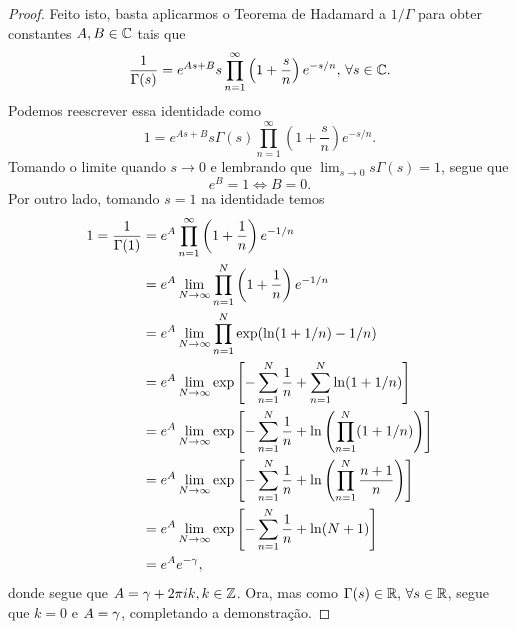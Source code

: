 \begin{proof}
        Feito isto, basta aplicarmos o Teorema de Hadamard a $1/\Gamma$ para obter constantes
        $A,B\in\mathbb{C}$ tais que
        \[
        \frac{1}{\Gamma(s)} = e^{As + B}s\prod_{n=1}^{\infty} \left(1 + \frac{s}{n}\right)e^{-s/n}, \,
        \forall s\in\mathbb{C}.
        \]
        Podemos reescrever essa identidade como
        \[
        1 = e^{As + B}s\Gamma(s)\prod_{n=1}^{\infty} \left(1 + \frac{s}{n}\right)e^{-s/n}.
        \]
        Tomando o limite quando $s\to 0$ e lembrando que $\lim_{s\to 0}s\Gamma(s) = 1$, segue que
        \[
        e^B = 1 \iff B = 0.
        \]
        Por outro lado, tomando $s=1$ na identidade temos
        \begin{align*}
            1 = \frac{1}{\Gamma(1)} &= e^A \prod_{n=1}^{\infty} \left(1 + \frac{1}{n}\right)e^{-1/n} \\
                                &= e^A \lim_{N\to\infty}\prod_{n=1}^{N} \left(1 + \frac{1}{n}\right)e^{-1/n} \\
                                &= e^A \lim_{N\to\infty}\prod_{n=1}^{N} \exp(\ln(1+1/n) - 1/n) \\
                                &= e^A \lim_{N\to\infty} \exp\left[ -\sum_{n=1}^N \frac{1}{n} +
                                                \sum_{n=1}^N \ln(1 + 1/n) \right] \\
                                &= e^A \lim_{N\to\infty} \exp\left[ -\sum_{n=1}^N \frac{1}{n} +
                                                \ln\left( \prod_{n=1}^N (1 + 1/n) \right) \right] \\
                                &= e^A \lim_{N\to\infty} \exp\left[ -\sum_{n=1}^N \frac{1}{n} +
                                                \ln\left( \prod_{n=1}^N \frac{n+1}{n} \right) \right] \\
                                &= e^A \lim_{N\to\infty} \exp\left[ -\sum_{n=1}^N \frac{1}{n} +
                                                \ln(N+1) \right] \\
                                &= e^Ae^{-\gamma},
        \end{align*}
        donde segue que $A = \gamma + 2\pi ik, k\in\mathbb{Z}$. Ora, mas como $\Gamma(s)\in\mathbb{R}, \, \forall s\in\mathbb{R}$,
        segue que $k = 0$ e $A = \gamma$, completando a demonstração.
    \end{proof}
